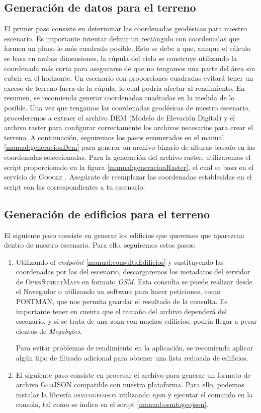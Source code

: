 \documentclass[a4paper, 11pt]{book}
\begin{document}
\subsection{Generación de datos para el terreno}
El primer paso consiste en determinar las coordenadas geodésicas para nuestro escenario. Es importante intentar definir un rectángulo con coordenadas que formen un plano lo más cuadrado posible. Esto se debe a que, aunque el cálculo se basa en ambas dimensiones, la cúpula del cielo se construye utilizando la coordenada más corta para asegurarse de que no tengamos una parte del área sin cubrir en el horizonte. 
Un escenario con proporciones cuadradas evitará tener un exceso de terreno fuera de la cúpula, lo cual podría afectar al rendimiento. En resumen, se recomienda generar coordenadas cuadradas en la medida de lo posible.
Una vez que tengamos las coordenadas geodésicas de nuestro escenario, procederemos a extraer el archivo \textsc{DEM} (Modelo de Elevación Digital) y el archivo \gls{raster} para configurar correctamente los archivos necesarios para crear el terreno. A continuación, seguiremos los pasos enumerados en el manual \ref{manual:generacionDem} para generar un archivo binario de alturas basado en las coordenadas seleccionadas. Para la generación del archivo raster, utilizaremos el script proporcionado en la figura \ref{manual:generacionRaster}, el cual se basa en el servicio de \textsc{Google} \cite{googleearthengine}. Asegúrate de reemplazar las coordenadas establecidas en el script con las correspondientes a tu escenario.

\subsection{Generación de edificios para el terreno}
El siguiente paso consiste en generar los edificios que queremos que aparezcan dentro de nuestro escenario. Para ello, seguiremos estos pasos:

\begin{enumerate}
	\item Utilizando el \emph{endpoint} \ref{manual:consultaEdificios} y sustituyendo las coordenadas por las del escenario, descargaremos los metadatos del servidor de \textsc{OpenStreetMaps} en formato \emph{OSM}. Esta consulta se puede realizar desde el Navegador o utilizando un software para hacer peticiones, como \textsc{POSTMAN}, que nos permita guardar el resultado de la consulta. Es importante tener en cuenta que el tamaño del archivo dependerá del escenario, y si se trata de una zona con muchos edificios, podría llegar a pesar cientos de \emph{Megabytes}. 
	
	Para evitar problemas de rendimiento en la aplicación, se recomienda aplicar algún tipo de filtrado adicional para obtener una lista reducida de edificios.
	\item El siguiente paso consiste en procesar el archivo para generar un formato de archivo \textsc{GeoJSON} compatible con nuestra plataforma. Para ello, podemos instalar la librería \textsc{osmtogeojson} utilizando \emph{\gls{npm}} y ejecutar el comando en la consola, tal como se indica en el script \ref{manual:osmtogeojson}.
\end{enumerate}
\end{document}
